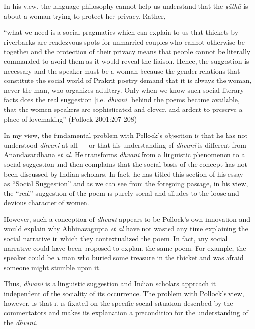 In his view, the language-philosophy cannot help us understand that the \textsl{gāthā} is about a woman trying to protect her privacy. Rather, 


\begin{myquote}
``what we need is a social pragmatics which can explain to us that thickets by riverbanks are rendezvous spots for unmarried couples who cannot otherwise be together and the protection of their privacy means that people cannot be literally commanded to avoid them as it would reveal the liaison. Hence, the suggestion is necessary and the speaker must be a woman because the gender relations that constitute the social world of Prakrit poetry demand that it is always the woman, never the man, who organizes adultery. Only when we know such social-literary facts does the real suggestion [i.e. \textsl{dhvani}] behind the poems become available, that the women speakers are sophisticated and clever, and ardent to preserve a place of lovemaking''
\hfill (Pollock 2001:207-208)
\end{myquote}

In my view, the fundamental problem with Pollock's objection is that he has not understood \textsl{dhvani} at all --- or that his understanding of \textsl{dhvani} is different from Ānandavardhana \textsl{et al}. He transforms \textsl{dhvani} from a linguistic phenomenon to a social suggestion and then complains that the social basis of the concept has not been discussed by Indian scholars. In fact, he has titled this section of his essay as ``Social Suggestion'' and as we can see from the foregoing passage, in his view, the ``real'' suggestion of the poem is purely social and alludes to the loose and devious character of women. 

However, such a conception of \textsl{dhvani} appears to be Pollock's own innovation and would explain why Abhinavagupta \textsl{et al} have not wasted any time explaining the social narrative in which they contextualized the poem. In fact, any social narrative could have been proposed to explain the same poem. For example, the speaker could be a man who buried some treasure in the thicket and was afraid someone might stumble upon it. 

Thus, \textsl{dhvani} is a linguistic suggestion and Indian scholars approach it independent of the sociality of its occurrence. The problem with Pollock's view, however, is that it is fixated on the specific social situation described by the commentators and makes its explanation a precondition for the understanding of the \textsl{dhvani}. 

